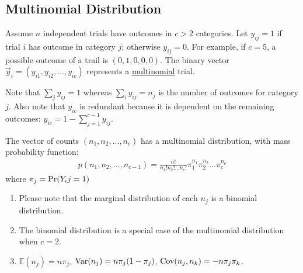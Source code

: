 \documentclass[11pt]{elegantbook}
\begin{document}
\subsection{Multinomial Distribution}
Assume $n$ independent trials have outcomes in $c > 2$ categories. Let $y_{ij} = 1$ if trial $i$ has outcome in category $j$; otherwise $y_{ij} = 0$. For example, if $c = 5$, a possible outcome of a trail is $(0, 1, 0, 0, 0)$. The binary vector $\vec{y}_i = (y_{i1}, y_{i2}, . . . , y_{ic})$ represents a \underline{multinomial} trial.

Note that $\sum_{j}y_{ij}=1$ whereas $\sum_{i}y_{ij}=n_j$ is the number of outcomes for category $j$. Also note that $y_{ic}$ is redundant because it is dependent on the remaining outcomes: $y_{ic} = 1 - \sum_{j=1}^{c-1} y_{ij}$.

The vector of counts $(n_1,n_2,...,n_c)$ has a multinomial distribution, with mass probability function:
\begin{equation}
    \begin{aligned}
        p(n_1,n_2,...,n_{c-1})=\frac{n!}{n_1!n_2!...n_c!}\pi_1^{n_1}\pi_2^{n_2}...\pi_c^{n_c}
    \end{aligned}
    \nonumber
\end{equation}
where $\pi_j=\textnormal{Pr}(Y_ij=1)$
\begin{enumerate}
    \item Please note that the marginal distribution of each $n_j$ is a binomial distribution.
    \item The binomial distribution is a special case of the multinomial distribution when $c = 2$.
    \item $\mathbb{E}(n_j)=n\pi_j$, $\textnormal{Var}(n_j)=n\pi_j(1-\pi_j)$, $\textnormal{Cov}(n_j,n_k)=-n\pi_j\pi_k$.
\end{enumerate}
\end{document}
